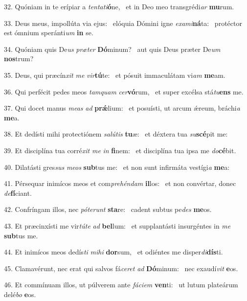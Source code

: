32. Quóniam in te erípiar a \textit{ten}\textit{ta}\textit{ti}\textbf{ó}ne, \ast\  et in Deo meo transgrédi\textit{ar} \textbf{mu}rum.\

33. Deus meus, impollúta via ejus: \dag\  elóquia Dómini igne \textit{ex}\textit{a}\textit{mi}\textbf{ná}ta: \ast\  protéctor est ómnium speránti\textit{um} \textbf{in} se.\

34. Quóniam quis De\textit{us} \textit{præ}\textit{ter} \textbf{Dó}minum? \ast\  aut quis Deus præter De\textit{um} \textbf{nos}trum?\

35. Deus, qui præcín\textit{xit} \textit{me} \textit{vir}\textbf{tú}te: \ast\  et pósuit immaculátam vi\textit{am} \textbf{me}am.\

36. Qui perfécit pedes meos \textit{tam}\textit{quam} \textit{cer}\textbf{vó}rum, \ast\  et super excélsa stá\textit{tu}\textbf{ens} me.\

37. Qui docet manus \textit{me}\textit{as} \textit{ad} \textbf{prǽ}lium: \ast\  et posuísti, ut arcum ǽreum, bráchi\textit{a} \textbf{me}a.\

38. Et dedísti mihi protectiónem \textit{sa}\textit{lú}\textit{tis} \textbf{tu}æ: \ast\  et déxtera tua \textit{su}\textbf{scé}pit me:\

39. Et disciplína tua corré\textit{xit} \textit{me} \textit{in} \textbf{fi}nem: \ast\  et disciplína tua ipsa me \textit{do}\textbf{cé}bit.\

40. Dilatásti gres\textit{sus} \textit{me}\textit{os} \textbf{sub}tus me: \ast\  et non sunt infirmáta vestígi\textit{a} \textbf{me}a:\

41. Pérsequar inimícos meos et com\textit{pre}\textit{hén}\textit{dam} \textbf{il}los: \ast\  et non convértar, donec \textit{de}\textbf{fí}ciant.\

42. Confríngam illos, nec \textit{pót}\textit{e}\textit{runt} \textbf{sta}re: \ast\  cadent subtus pe\textit{des} \textbf{me}os.\

43. Et præcinxísti me vir\textit{tú}\textit{te} \textit{ad} \textbf{bel}lum: \ast\  et supplantásti insurgéntes in \textit{me} \textbf{sub}tus me.\

44. Et inimícos meos dedís\textit{ti} \textit{mi}\textit{hi} \textbf{dor}sum, \ast\  et odiéntes me disper\textit{di}\textbf{dís}ti.\

45. Clamavérunt, nec erat qui salvos fá\textit{ce}\textit{ret} \textit{ad} \textbf{Dó}minum: \ast\  nec exaudí\textit{vit} \textbf{e}os.\

46. Et commínuam illos, ut púlverem ante \textit{fá}\textit{ci}\textit{em} \textbf{ven}ti: \ast\  ut lutum plateárum delé\textit{bo} \textbf{e}os.\

